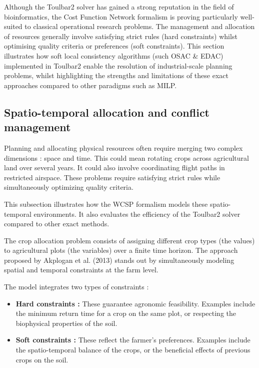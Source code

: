 \documentclass[a4paper]{article}
\begin{document}
Although the Toulbar2 solver has gained a strong reputation in the field of bioinformatics, 
the Cost Function Network formalism is proving particularly well-suited to classical operational research problems. 
The management and allocation of resources generally involve satisfying strict rules (hard constraints) 
whilst optimising quality criteria or preferences (soft constraints). 
This section illustrates how soft local consistency algorithms (such \ac{OSAC} \& \ac{EDAC}) implemented in Toulbar2 
enable the resolution of industrial-scale planning problems, whilst highlighting the strengths and limitations 
of these exact approaches compared to other paradigms such as \ac{MILP}.

\subsection{Spatio-temporal allocation and conflict management}

Planning and allocating physical resources often require merging two complex dimensions : space and time. 
This could mean rotating crops across agricultural land over several years. It could also involve coordinating 
flight paths in restricted airspace. These problems require satisfying strict rules while simultaneously optimizing quality criteria.

This subsection illustrates how the \ac{WCSP} formalism models these spatio-temporal environments. 
It also evaluates the efficiency of the Toulbar2 solver compared to other exact methods.
\newline

The crop allocation problem consists of assigning different crop types (the values) to agricultural plots (the variables) over a finite time horizon. 
The approach proposed by Akplogan et al. (2013)\cite{akplogan_solving_2013} stands out by simultaneously modeling spatial and temporal constraints at the farm level.
\newline

The model integrates two types of constraints :

\begin{itemize}
    \item \textbf{Hard constraints :} These guarantee agronomic feasibility. Examples include the minimum return time for a crop on the same plot, or respecting the biophysical properties of the soil.
    \item \textbf{Soft constraints :} These reflect the farmer's preferences. Examples include the spatio-temporal balance of the crops, or the beneficial effects of previous crops on the soil.
\end{itemize}
\end{document}
